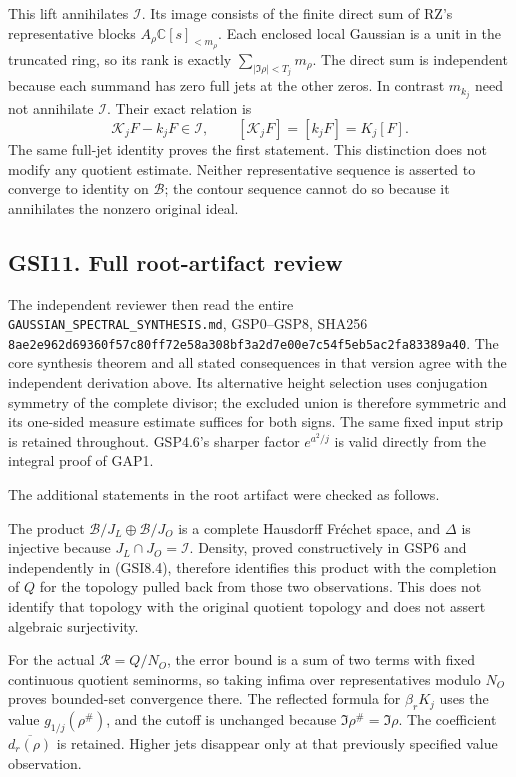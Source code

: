This lift annihilates \(\mathcal I\). Its image consists of the finite
direct sum of RZ's representative blocks
\(A_\rho\mathbb C[s]_{<m_\rho}\). Each enclosed local Gaussian is a unit
in the truncated ring, so its rank is exactly
\(\sum_{|\Im\rho|<T_j}m_\rho\). The direct sum is independent because
each summand has zero full jets at the other zeros. In contrast
\(m_{k_j}\) need not annihilate \(\mathcal I\). Their exact relation is
\[
\mathscr K_jF-k_jF\in\mathcal I,
\qquad [\mathscr K_jF]=[k_jF]=K_j[F].
\tag{GSI10.3}
\] The same full-jet identity proves the first statement. This
distinction does not modify any quotient estimate. Neither
representative sequence is asserted to converge to identity on
\(\mathcal B\); the contour sequence cannot do so because it annihilates
the nonzero original ideal.

\subsection{GSI11. Full root-artifact
review}\label{gsi11.-full-root-artifact-review}

The independent reviewer then read the entire
\nolinkurl{GAUSSIAN_SPECTRAL_SYNTHESIS.md}, GSP0--GSP8, SHA256
\nolinkurl{8ae2e962d69360f57c80ff72e58a308bf3a2d7e00e7c54f5eb5ac2fa83389a40}.
The core synthesis theorem and all stated consequences in that version
agree with the independent derivation above. Its alternative height
selection uses conjugation symmetry of the complete divisor; the
excluded union is therefore symmetric and its one-sided measure estimate
suffices for both signs. The same fixed input strip is retained
throughout. GSP4.6's sharper factor \(e^{a^2/j}\) is valid directly from
the integral proof of GAP1.

The additional statements in the root artifact were checked as follows.

The product \(\mathcal B/J_L\oplus\mathcal B/J_O\) is a complete
Hausdorff Fréchet space, and \(\Delta\) is injective because
\(J_L\cap J_O=\mathcal I\). Density, proved constructively in GSP6 and
independently in (GSI8.4), therefore identifies this product with the
completion of \(Q\) for the topology pulled back from those two
observations. This does not identify that topology with the original
quotient topology and does not assert algebraic surjectivity.

For the actual \(\mathcal R=Q/N_O\), the error bound is a sum of two
terms with fixed continuous quotient seminorms, so taking infima over
representatives modulo \(N_O\) proves bounded-set convergence there. The
reflected formula for \(\beta_rK_j\) uses the value
\(g_{1/j}(\rho^\#)\), and the cutoff is unchanged because
\(\Im\rho^\#=\Im\rho\). The coefficient \(\overline{d_r(\rho)}\) is
retained. Higher jets disappear only at that previously specified value
observation.

